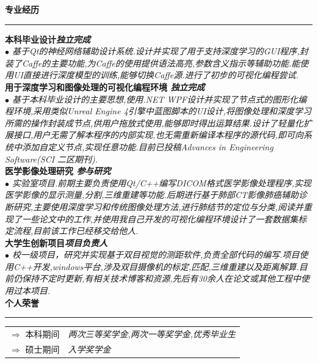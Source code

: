 \documentclass[a4paper,12pt,final]{memoir}
\newcommand{\myThemeColor}{RoyalBlue}
\newcommand{\SmallSep}{\vspace{0.9em}}
\newcommand{\CVSection}[1]
	{\Large\textbf{#1}\par
	\vspace{0.2cm}\normalsize\normalfont}
\newcommand{\CVItem}[1]
	{\textbf{\color{\myThemeColor} #1}}
\begin{document}
\begin{CJK*}{UTF8}{gbsn}
\CVSection{专业经历}
\hrule
\SmallSep
\CVItem{本科毕业设计\hfill\emph{独立完成}}\\
\textit{$\bullet$ 基于Qt的神经网络辅助设计系统.设计并实现了用于支持深度学习的GUI程序,封装了Caffe的主要功能,为Caffe的使用提供语法高亮,参数含义指示等辅助功能.能使用UI直接进行深度模型的训练,能够切换Caffe源.进行了初步的可视化编程尝试.} 
\\
\CVItem{用于深度学习和图像处理的可视化编程环境 \hfill\emph{独立完成}}\\
\textit{$\bullet$ 基于本科毕业设计的主要思想,使用.NET WPF设计并实现了节点式的图形化编程环境,采用类似Unreal Engine 4引擎中蓝图脚本的UI设计,将图像处理和深度学习所需的操作封装成节点,供用户拖放式使用,能够即时得出运算结果.设计了轻量化扩展接口,用户无需了解本程序的内部实现,也无需重新编译本程序的源代码,即可向系统中添加自定义节点,实现任意功能.目前已投稿Advances in Engineering Software(SCI 二区期刊).}
\\
\CVItem{医学影像处理研究 \hfill\emph{参与研究}}\\
\textit{$\bullet$ 实验室项目.前期主要负责使用Qt/C++编写DICOM格式医学影像处理程序,实现医学影像的显示测量,分割,三维重建等功能.后期进行基于肺部CT影像肺癌辅助诊断研究,主要使用深度学习和传统图像处理方法,进行肺结节的定位与分类,阅读并重现了一些论文中的工作,并使用我自己开发的可视化编程环境设计了一套数据集标定流程,目前该工作已经移交给他人.}
\\
\CVItem{大学生创新项目\hfill\emph{项目负责人}}\\
\textit{$\bullet$ 校一级项目，研究并实现基于双目视觉的测距软件,负责全部代码的编写.项目使用C++开发,windows平台,涉及双目摄像机的标定,匹配,三维重建以及距离解算.目前仍保持不定时更新,有相关技术博客和资源,先后有30余人在论文或其他工程中使用过本项目.} 
\\

\CVSection{个人荣誉}
\hrule
\SmallSep
	\begin{tabular}{l|l}
		$\Rightarrow$ 本科期间&\textit{两次三等奖学金,两次一等奖学金,优秀毕业生}\footnotesize\\
		$\Rightarrow$ 硕士期间&\textit{入学奖学金}\\
	\end{tabular}

\end{CJK*}
\end{document}
